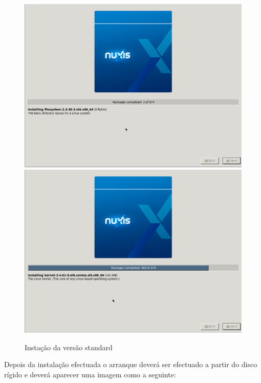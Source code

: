\begin{figure}[H]
\begin{center}
	\includegraphics[scale=0.2]{screenshots/install/unitbox/progress_install_01.png}
	\includegraphics[scale=0.2]{screenshots/install/unitbox/progress_install_02.png}
\caption{Instação da versão standard}
	\label{fig:installation_standard_02}
	\end{center}
\end{figure}

Depois da instalação efectuada o arranque deverá ser efectuado a partir do disco rígido e deverá aparecer uma imagem como a seguinte:

